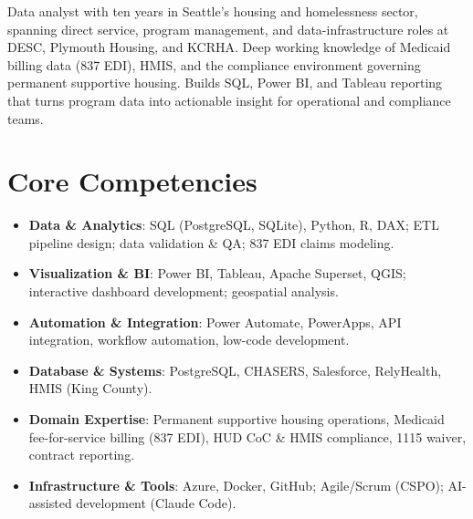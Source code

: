 \documentclass[11pt,a4paper,sans]{moderncv}
\begin{document}
\makecvtitle


\vspace{6pt}
\small{Data analyst with ten years in Seattle's housing and homelessness sector, spanning direct service, program management, and data-infrastructure roles at DESC, Plymouth Housing, and KCRHA. Deep working knowledge of Medicaid billing data (837 EDI), HMIS, and the compliance environment governing permanent supportive housing. Builds SQL, Power BI, and Tableau reporting that turns program data into actionable insight for operational and compliance teams.}


\section{Core Competencies}
\vspace{1pt}
\begin{itemize}

\item \textbf{Data \& Analytics}: SQL (PostgreSQL, SQLite), Python, R, DAX; ETL pipeline design; data validation \& QA; 837 EDI claims modeling.

\item \textbf{Visualization \& BI}: Power BI, Tableau, Apache Superset, QGIS; interactive dashboard development; geospatial analysis.

\item \textbf{Automation \& Integration}: Power Automate, PowerApps, API integration, workflow automation, low-code development.

\item \textbf{Database \& Systems}: PostgreSQL, CHASERS, Salesforce, RelyHealth, HMIS (King County).

\item \textbf{Domain Expertise}: Permanent supportive housing operations, Medicaid fee-for-service billing (837 EDI), HUD CoC \& HMIS compliance, 1115 waiver, contract reporting.

\item \textbf{Infrastructure \& Tools}: Azure, Docker, GitHub; Agile/Scrum (CSPO); AI-assisted development (Claude Code).

\end{itemize}
\end{document}
